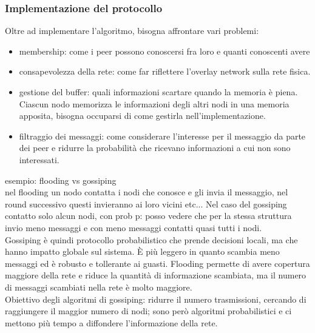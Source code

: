 \documentclass{article}
\begin{document}
\subsubsection{Implementazione del protocollo}
Oltre ad implementare l'algoritmo, bisogna affrontare vari problemi:
\begin{itemize}
\item membership: come i peer possono conoscersi fra loro e quanti conoscenti avere
\item consapevolezza della rete: come far riflettere l'overlay network sulla rete fisica.
\item gestione del buffer: quali informazioni scartare quando la memoria è piena. Ciascun nodo memorizza le informazioni degli altri nodi in una memoria apposita, bisogna occuparsi di come gestirla nell'implementazione.
\item filtraggio dei messaggi: come considerare l'interesse per il messaggio da parte dei peer e ridurre la probabilità che ricevano informazioni a cui non sono interessati.
\end{itemize}
esempio: flooding vs gossiping\\ nel flooding un nodo contatta i nodi che conosce e gli invia il messaggio, nel round successivo questi invieranno ai loro vicini etc... Nel caso del gossiping contatto solo alcun nodi, con prob p: posso vedere che per la stessa struttura invio meno messaggi e con meno messaggi contatti quasi tutti i nodi.\\ Gossiping è quindi protocollo probabilistico che prende decisioni locali, ma che hanno impatto globale sul sistema. È più leggero in quanto scambia meno messaggi ed è robusto e tollerante ai guasti. Flooding permette di avere copertura maggiore della rete e riduce la quantità di  informazione scambiata, ma il numero di messaggi scambiati nella rete è molto maggiore. \\Obiettivo degli algoritmi di gossiping: ridurre il numero trasmissioni, cercando di raggiungere il maggior numero di nodi; sono però algoritmi probabilistici e ci mettono più tempo a diffondere l'informazione della rete.
\end{document}
